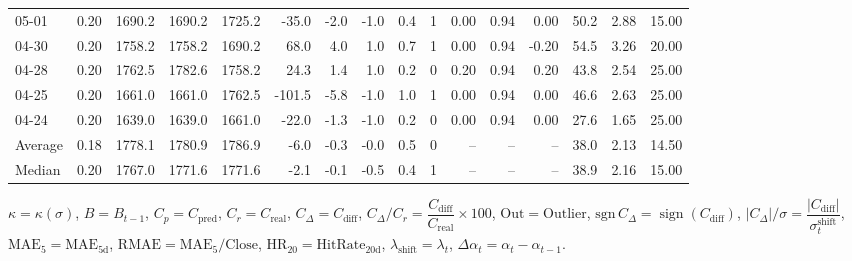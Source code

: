 \begin{threeparttable}
{\begin{tabular}{lrrrrrrrrrrrrrrr}
  05-01 &     0.20 & 1690.2 & 1690.2 & 1725.2 &      -35.0 &           -2.0 &                     -1.0 &                 0.4 &              1 &       0.00 &      0.94 &           0.00 &             50.2 &            2.88 &                  15.00 \\
  04-30 &     0.20 & 1758.2 & 1758.2 & 1690.2 &       68.0 &            4.0 &                      1.0 &                 0.7 &              1 &       0.00 &      0.94 &          -0.20 &             54.5 &            3.26 &                  20.00 \\
  04-28 &     0.20 & 1762.5 & 1782.6 & 1758.2 &       24.3 &            1.4 &                      1.0 &                 0.2 &              0 &       0.20 &      0.94 &           0.20 &             43.8 &            2.54 &                  25.00 \\
  04-25 &     0.20 & 1661.0 & 1661.0 & 1762.5 &     -101.5 &           -5.8 &                     -1.0 &                 1.0 &              1 &       0.00 &      0.94 &           0.00 &             46.6 &            2.63 &                  25.00 \\
  04-24 &     0.20 & 1639.0 & 1639.0 & 1661.0 &      -22.0 &           -1.3 &                     -1.0 &                 0.2 &              0 &       0.00 &      0.94 &           0.00 &             27.6 &            1.65 &                  25.00 \\
Average &     0.18 & 1778.1 & 1780.9 & 1786.9 &       -6.0 &           -0.3 &                     -0.0 &                 0.5 &              0 &         -- &        -- &             -- &             38.0 &            2.13 &                  14.50 \\
 Median &     0.20 & 1767.0 & 1771.6 & 1771.6 &       -2.1 &           -0.1 &                     -0.5 &                 0.4 &              1 &         -- &        -- &             -- &             38.9 &            2.16 &                  15.00 \\
\bottomrule
\end{tabular}
}
\begin{tablenotes}\footnotesize
\item $\kappa=\kappa(\sigma)$, $B=B_{t-1}$, $C_p=C_{\text{pred}}$, $C_r=C_{\text{real}}$, $C_\Delta=C_{\text{diff}}$, $C_\Delta/C_r=\dfrac{C_{\text{diff}}}{C_{\text{real}}}\times100$, $\mathrm{Out}=\text{Outlier}$, $\mathrm{sgn}\,C_\Delta=\operatorname{sign}(C_{\text{diff}})$, $|C_\Delta|/\sigma=\dfrac{|C_{\text{diff}}|}{\sigma_t^{\text{shift}}}$, $\mathrm{MAE}_5=\mathrm{MAE}_{5\text{d}}$, $\mathrm{RMAE}= \mathrm{MAE}_5 / \text{Close}$, $\mathrm{HR}_{20}=\mathrm{HitRate}_{20\text{d}}$, 
$\lambda_{\text{shift}}=\lambda_t$, 
$\Delta\alpha_t=\alpha_t-\alpha_{t-1}$.
\end{tablenotes}
\end{threeparttable}
\endgroup

